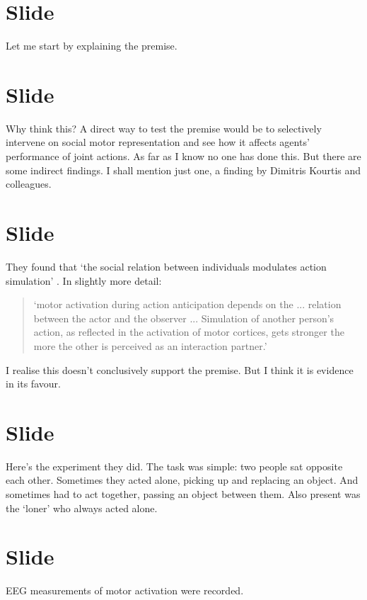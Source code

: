 \documentclass[12pt,\papersize]{extarticle}
\begin{document}
\section{Slide}
Let me start by explaining the premise.


\section{Slide}
Why think this?
A direct way to test the premise would be to selectively intervene on social motor representation and see how it affects agents’ performance of joint actions.
As far as I know no one has done this.
But there are some indirect findings.
I shall mention just one, a finding by Dimitris Kourtis and colleagues.




\section{Slide}
They found that `the social relation between individuals modulates action simulation' \citep[p.\ 1]{kourtis:2010_favoritism}.  
In slightly more detail:
\begin{quote}
`motor activation during action anticipation depends on the ... relation between the actor and the observer ... Simulation of another person’s action, as reﬂected in the activation of motor cortices, gets stronger the more the other is perceived as an interaction partner.’  \citep[p.\ 4]{kourtis:2010_favoritism}
\end{quote}
I realise this doesn’t conclusively support the premise.  But I think it is evidence in its favour.



\section{Slide}
Here’s the experiment they did.
The task was simple: two people sat opposite each other.  Sometimes they acted alone, picking up and replacing an object.  And sometimes had to act together, passing an object between them.  Also present was the ‘loner’ who always acted alone.



\section{Slide}
EEG measurements of motor activation were recorded.
\end{document}
